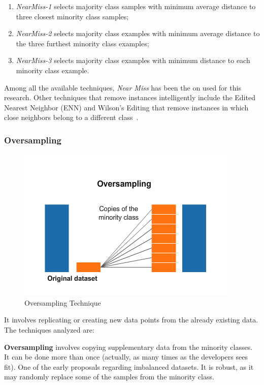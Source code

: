 \begin{enumerate}
	\item \textit{NearMiss-1} selects majority class samples with minimum 
	average distance to three closest minority class samples; 
	\item \textit{NearMiss-2} selects majority class examples with minimum 
	average distance to the three furthest minority class examples;
	\item \textit{NearMiss-3} selects majority class examples with minimum 
	distance to each minority class example.
\end{enumerate}

Among all the available techniques, \textit{Near Miss} has been the on used
for this research. Other techniques that remove instances intelligently include 
the Edited Nearest Neighbor (ENN) and Wilson's Editing that remove instances in 
which close neighbors belong to a  different class~\cite{wilson1972asymptotic}.

\subsubsection{Oversampling}\label{sec:oversampling}

\begin{figure}[h!]
\centering
\includegraphics[width=.7\textwidth]{figures/Oversampling.png}
\caption{Oversampling Technique \cite{OverUnderIbm2019}}
\label{fig:oversampling}
\end{figure}

It involves replicating or creating new data points from the already 
existing data. The techniques analyzed are:

\textbf{Oversampling} involves copying supplementary data from the minority 
classes. It can be done more than once (actually, as many times as the 
developers sees fit). One of the early proposals regarding imbalanced datasets. 
It is robust, as it may randomly replace some of the samples from the minority 
class.

